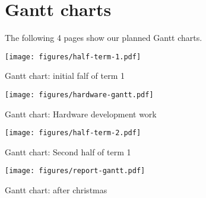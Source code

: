 \chapter{Gantt charts}\label{ch:gantt}

The following 4 pages show our planned Gantt charts.

\begin{landscape}

\begin{table}
    \texttt{[image: figures/half-term-1.pdf]}
    \caption{Gantt chart: initial falf of term 1}
    \label{table:gantt:term11}
\end{table}

\begin{table}
    \texttt{[image: figures/hardware-gantt.pdf]}
    \caption{Gantt chart: Hardware development work}
    \label{table:gantt:hardware}
\end{table}

\begin{table}
    \texttt{[image: figures/half-term-2.pdf]}
    \caption{Gantt chart: Second half of term 1}
    \label{table:gantt:term12}
\end{table}

\begin{table}[h!]
    \texttt{[image: figures/report-gantt.pdf]}
    \caption{Gantt chart: after christmas}
    \label{table:gantt:report}
\end{table}

\end{landscape}